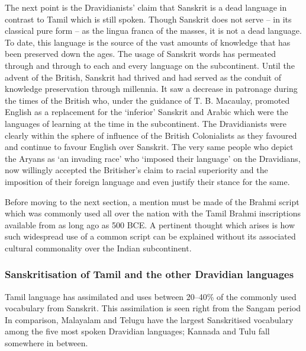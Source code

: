 The next point is the Dravidianists’ claim that Sanskrit is a dead language in contrast to Tamil which is still spoken. Though Sanskrit does not serve – in its classical pure form – as the lingua franca of the masses, it is not a dead language. To date, this language is the source of the vast amounts of knowledge that has been preserved down the ages. The usage of Sanskrit words has permeated through and through to each and every language on the subcontinent. Until the advent of the British, Sanskrit had thrived and had served as the conduit of knowledge preservation through millennia. It saw a decrease in patronage during the times of the British who, under the guidance of T. B. Macaulay, promoted English as a replacement for the ‘inferior’ Sanskrit and Arabic which were the languages of learning at the time in the subcontinent. The Dravidianists were clearly within the sphere of influence of the British Colonialists as they favoured and continue to favour English over Sanskrit. The very same people who depict the Aryans as ‘an invading race’ who ‘imposed their language’ on the Dravidians, now willingly accepted the Britisher’s claim to racial superiority and the imposition of their foreign language and even justify their stance for the same.

Before moving to the next section, a mention must be made of the Brahmi script which was commonly used all over the nation with the Tamil Brahmi inscriptions available from as long ago as 500 BCE. A pertinent thought which arises is how such widespread use of a common script can be explained without its associated cultural commonality over the Indian subcontinent.


\subsubsection*{Sanskritisation of Tamil and the other Dravidian languages}

Tamil language has assimilated and uses between 20–40\% of the commonly used vocabulary from Sanskrit. This assimilation is seen right from the Sangam period In comparison, Malayalam and Telugu have the largest Sanskritised vocabulary among the five most spoken Dravidian languages; Kannada and Tulu fall somewhere in between.

